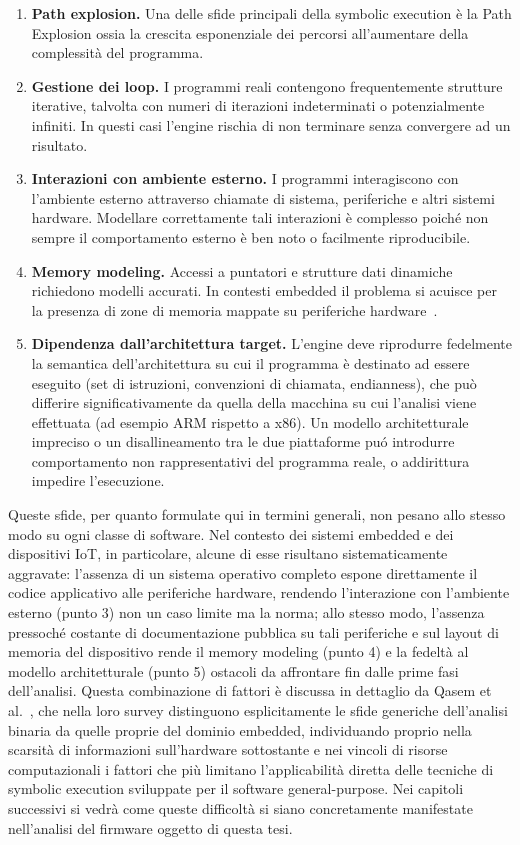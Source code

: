 \begin{enumerate}
    \item \textbf{Path explosion.} Una delle sfide principali della symbolic execution è la Path Explosion ossia la
    crescita esponenziale dei percorsi all'aumentare della complessità del programma.
    \item \textbf{Gestione dei loop.} I programmi reali contengono frequentemente strutture iterative, talvolta con
    numeri di iterazioni indeterminati o potenzialmente infiniti. In questi casi l'engine rischia di non
    terminare senza convergere ad un risultato.
    \item \textbf{Interazioni con ambiente esterno.} I programmi interagiscono con l'ambiente esterno attraverso
    chiamate di sistema, periferiche e altri sistemi hardware. Modellare correttamente tali interazioni
    è complesso poiché non sempre il comportamento esterno è ben noto o facilmente riproducibile.
    \item \textbf{Memory modeling.} Accessi a puntatori e strutture dati dinamiche richiedono modelli accurati. In contesti embedded il problema si acuisce per la presenza di zone di memoria mappate su periferiche hardware~\cite{davidson2013fie}.
    \item \textbf{Dipendenza dall'architettura target.} L'engine deve riprodurre fedelmente la semantica dell'architettura su cui il programma è destinato ad essere eseguito (set di istruzioni, convenzioni di chiamata, endianness), che può differire significativamente da quella della macchina su cui l'analisi viene effettuata (ad esempio ARM rispetto a x86). Un modello architetturale impreciso o un disallineamento tra le due piattaforme puó introdurre comportamento non rappresentativi del programma reale, o addirittura impedire l'esecuzione.
\end{enumerate}

    Queste sfide, per quanto formulate qui in termini generali, non pesano allo stesso 
    modo su ogni classe di software. Nel contesto dei sistemi embedded e dei dispositivi 
    IoT, in particolare, alcune di esse risultano sistematicamente aggravate: l'assenza 
    di un sistema operativo completo espone direttamente il codice applicativo alle 
    periferiche hardware, rendendo l'interazione con l'ambiente esterno (punto 3) non 
    un caso limite ma la norma; allo stesso modo, l'assenza pressoché costante di 
    documentazione pubblica su tali periferiche e sul layout di memoria del dispositivo 
    rende il memory modeling (punto 4) e la fedeltà al modello architetturale (punto 5) 
    ostacoli da affrontare fin dalle prime fasi dell'analisi. Questa combinazione di fattori è discussa in dettaglio 
    da Qasem et al.~\cite{qasem2021survey}, che nella loro survey distinguono 
    esplicitamente le sfide generiche dell'analisi binaria da quelle proprie del 
    dominio embedded, individuando proprio nella scarsità di informazioni 
    sull'hardware sottostante e nei vincoli di risorse computazionali i fattori che 
    più limitano l'applicabilità diretta delle tecniche di symbolic execution 
    sviluppate per il software general-purpose. Nei capitoli successivi si vedrà come 
    queste difficoltà si siano concretamente manifestate nell'analisi del firmware 
    oggetto di questa tesi.

